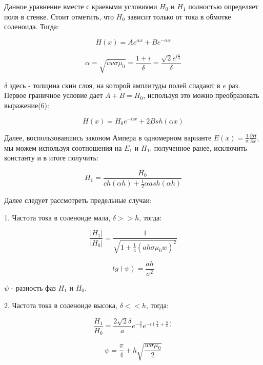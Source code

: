 \documentclass[a4paper,12pt]{article} %
\begin{document}
Данное уравнение вместе с краевыми условиями $H_0$ и $H_1$ полностью определяет поля в стенке. Стоит отметить, что $H_0$ зависит только от тока в обмотке соленоида. Тогда:

\begin{equation}
	H(x) = Ae^{\alpha x} + Be^{-\alpha x}
\end{equation}

\begin{equation}
	\alpha = \sqrt{iw\sigma\mu_0} = \frac{1 + i}{\delta} = \frac{\sqrt{2}e^{i\frac{\pi}{4}}}{\delta}
\end{equation}

$\delta$ здесь - толщина скин слоя, на которой амплитуды полей спадают в $e$ раз. Первое граничное условие дает $A + B = H_0$, используя это можно преобразовать выражение(6):

\begin{equation}
	H(x) = H_0e^{-\alpha x} + 2Bsh(\alpha x)
\end{equation}

Далее, воспользовавшись законом Ампера в одномерном варианте $E(x) = \frac{1}{\sigma}\frac{\partial H}{\partial x}$, мы можем используя соотношения на $E_1$ и $H_1$, полученное ранее, исключить константу и в итоге получить:

\begin{equation}
	H_1 = \frac{H_0}{ch(\alpha h) + \frac{1}{2}\alpha a sh(\alpha h) }
\end{equation}

Далее следует рассмотреть предельные случаи:

1. Частота тока в соленоиде мала, $\delta >> h$, тогда:

\begin{equation}
	\frac{|H_1|}{|H_0|} = \frac{1}{\sqrt{1 + \frac{1}{4}(ah\sigma \mu_0 w)^2}}
\end{equation}

\begin{equation}
	tg(\psi) = \frac{ah}{\sigma^2}
\end{equation}

$\psi$ - разность фаз $H_1$ и $H_0$.

2. Частота тока в соленоиде высока, $\delta << h$, тогда:

\begin{equation}
	\frac{H_1}{H_0} = \frac{2\sqrt{2}\delta}{a}e^{-\frac{h}{\delta}}e^{-i(\frac{\pi}{4} + \frac{h}{\delta})}
\end{equation}

\begin{equation}
	\psi = \frac{\pi}{4} + h\sqrt{\frac{w\sigma \mu_0}{2}}
\end{equation}
\end{document}
